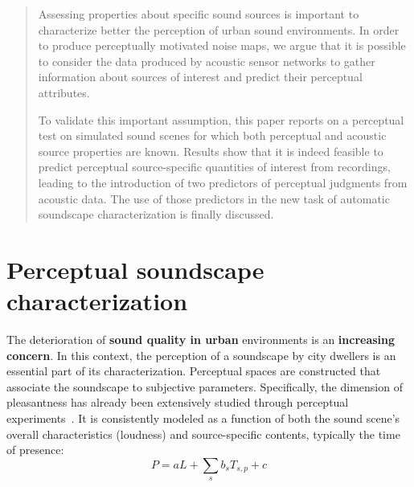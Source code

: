 \documentclass[a0,portrait]{a0poster}
\begin{document}
\begin{multicols}{2} %


\color{Navy} %

\begin{abstract}

Assessing properties about specific sound sources is important to  characterize better the perception of urban sound environments. In order to produce perceptually motivated noise maps, we argue that it is possible to consider the data produced by acoustic sensor networks to gather information about sources of interest and predict their perceptual attributes.

To validate this important assumption, this paper reports on a perceptual test on simulated sound scenes for which both perceptual and acoustic source properties are known. Results show that it is indeed feasible to predict perceptual source-specific quantities of interest from recordings, leading to the introduction of two predictors of perceptual judgments from acoustic data. The use of those predictors in the new task of automatic soundscape characterization is finally discussed.

\end{abstract}




\color{SaddleBrown} %

\section*{Perceptual soundscape characterization}

The deterioration of \textbf{sound quality in urban} environments is an \textbf{increasing concern}. In this context, the perception of a soundscape by city dwellers is an essential part of its characterization. Perceptual spaces are constructed that associate the soundscape to subjective parameters. Specifically, the dimension of pleasantness has already been extensively studied through perceptual experiments~\cite{aumond2017}. It is consistently modeled as a function of both the sound scene's overall characteristics (loudness) and source-specific contents, typically the time of presence:
\begin{equation}
P = aL + \sum_s b_sT_{s,p} + c
\end{equation}


\end{multicols}
\end{document}
